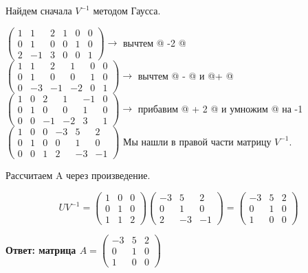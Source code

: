 \documentclass[a4paper,12pt]{article}
\makeatletter
\newcommand*{\rom}[1]{\expandafter\@slowromancap\romannumeral #1@}
\makeatother
\begin{document}
\begin{enumerate}
Найдем сначала $V^{-1}$ методом Гаусса.

$
\left(\begin{array}{ccc|ccc}  
1&1&2&1&0&0\\
0&1&0&0&1&0\\
2&-1&3&0&0&1
\end{array}\right) \rightarrow$ вычтем \rom{3} -2 \rom{1} \\
$
\left(\begin{array}{ccc|ccc}  
1&1&2&1&0&0\\
0&1&0&0&1&0\\
0&-3&-1&-2&0&1
\end{array}\right) \rightarrow$ вычтем \rom{1} - \rom{2} и   \rom{3}+ \rom{2}\\
$
\left(\begin{array}{ccc|ccc}  
1&0&2&1&-1&0\\
0&1&0&0&1&0\\
0&0&-1&-2&3&1
\end{array}\right) \rightarrow$ прибавим \rom{1} + 2 \rom{3} и   умножим \rom{3} на -1\\
$
\left(\begin{array}{ccc|ccc}  
1&0&0&-3&5&2\\
0&1&0&0&1&0\\
0&0&1&2&-3&-1
\end{array}\right) $
Мы нашли в правой части матрицу $V^{-1}$.

Рассчитаем A через произведение.

$$UV^{-1}=\begin{pmatrix}
1&0&0\\
0&1&0\\
1&1&2
\end{pmatrix}\begin{pmatrix}
-3&5&2\\
0&1&0\\
2&-3&-1
\end{pmatrix}=\begin{pmatrix}
-3&5&2\\
0&1&0\\
1&0&0
\end{pmatrix}$$

\textbf{Ответ: матрица $A=\begin{pmatrix}
-3&5&2\\
0&1&0\\
1&0&0
\end{pmatrix}$}



\end{enumerate}
\end{document}
